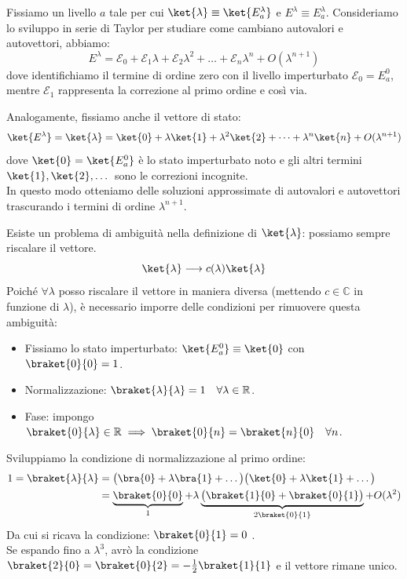 Fissiamo un livello \( a \) tale per cui \( \ket{\lambda} \equiv \ket{E_a^\lambda} \) e \( E^\lambda \equiv E_a^\lambda \).
Consideriamo lo sviluppo in serie di Taylor per studiare come cambiano autovalori e autovettori, abbiamo:
\begin{equation}
    E^\lambda = \mathcal{E}_0 + \mathcal{E}_1 \lambda + \mathcal{E}_2 \lambda^2 + \dots + \mathcal{E}_n \lambda^n + O(\lambda^{n+1})
\end{equation}
dove identifichiamo il termine di ordine zero con il livello imperturbato \( \mathcal{E}_0 = E_a^0 \), mentre \( \mathcal{E}_1 \) rappresenta la correzione al primo ordine e così via.

Analogamente, fissiamo anche il vettore di stato:
\begin{equation}
    \ket{E^\lambda} = \ket{\lambda} = \ket{0} + \lambda \ket{1} + \lambda^2 \ket{2} + \dots + \lambda^n \ket{n} + O(\lambda^{n+1})
\end{equation}
dove \( \ket{0} = \ket{E_a^0} \) è lo stato imperturbato noto e gli altri termini \( \ket{1}, \ket{2}, \dots \) sono le correzioni incognite.\\
In questo modo otteniamo delle soluzioni approssimate di autovalori e autovettori trascurando i termini di ordine \( \lambda^{n+1} \).

\begin{attention}
    Esiste un problema di ambiguità nella definizione di \( \ket{\lambda} \): possiamo sempre riscalare il vettore.
    \[
        \ket{\lambda} \longrightarrow c(\lambda) \ket{\lambda}
    \]
    Poiché \( \forall \lambda \) posso riscalare il vettore in maniera diversa (mettendo \( c \in \mathbb{C} \) in funzione di \( \lambda \)), è necessario imporre delle condizioni per rimuovere questa ambiguità:
    \begin{itemize}
        \item Fissiamo lo stato imperturbato: \( \ket{E_a^0} \equiv \ket{0} \) con \( \braket{0}{0}=1 \).
        \item Normalizzazione: \( \braket{\lambda}{\lambda} = 1 \quad \forall \lambda \in \mathbb{R} \).
        \item Fase: impongo \( \braket{0}{\lambda} \in \mathbb{R} \implies \braket{0}{n} = \braket{n}{0} \quad \forall n \).
    \end{itemize}

    Sviluppiamo la condizione di normalizzazione al primo ordine:
    \begin{align*}
        1 = \braket{\lambda}{\lambda} &= \big( \bra{0} + \lambda \bra{1} + \dots \big) \big( \ket{0} + \lambda \ket{1} + \dots \big) \\
        &= \underbrace{\braket{0}{0}}_{1} + \lambda \underbrace{\big( \braket{1}{0} + \braket{0}{1} \big)}_{2\braket{0}{1}} + O(\lambda^2)
    \end{align*}
    Da cui si ricava la condizione: \(\braket{0}{1} = 0\) .\\
    Se espando fino a \(\lambda^3\), avrò la condizione \(\braket{2}{0}= \braket{0}{2}= - \frac{1}{2}\braket{1}{1}\) e il vettore rimane unico.
\end{attention}

